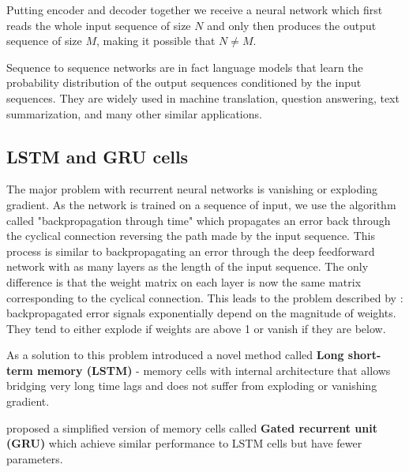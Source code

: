 Putting encoder and decoder together we receive a neural network which first reads the whole input sequence of size $N$ and only then produces the output sequence of size $M$, making it possible that $N \neq M$.

Sequence to sequence networks are in fact language models that learn the probability distribution of the output sequences conditioned by the input sequences. They are widely used in machine translation, question answering, text summarization, and many other similar applications.

\subsection{LSTM and GRU cells}
\label{sec:Background-LSTMandGRU}

The major problem with recurrent neural networks is vanishing or exploding gradient. As the network is trained on a sequence of input, we use the algorithm called "backpropagation through time" which propagates an error back through the cyclical connection reversing the path made by the input sequence. This process is similar to backpropagating an error through the deep feedforward network with as many layers as the length of the input sequence. The only difference is that the weight matrix on each layer is now the same matrix corresponding to the cyclical connection. This leads to the problem described by \cite{Hoch01}: backpropagated error signals exponentially depend on the magnitude of weights. They tend to either explode if weights are above 1 or vanish if they are below.

As a solution to this problem \cite{Hoch97} introduced a novel method called \textbf{Long short-term memory (LSTM)} - memory cells with internal architecture that allows bridging very long time lags and does not suffer from exploding or vanishing gradient.

\cite{Cho14} proposed a simplified version of memory cells called \textbf{Gated recurrent unit (GRU)} which achieve similar performance to LSTM cells but have fewer parameters.
